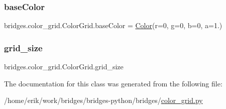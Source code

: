 \subsubsection{\texorpdfstring{base\+Color}{baseColor}}
{\footnotesize\ttfamily bridges.\+color\+\_\+grid.\+Color\+Grid.\+base\+Color = \hyperlink{classbridges_1_1color_1_1_color}{Color}(r=0, g=0, b=0, a=1.)\hspace{0.3cm}{\ttfamily [static]}}

\mbox{\label{classbridges_1_1color__grid_1_1_color_grid_af248634de8b3d7b92feef01eed40821b}} 
\subsubsection{\texorpdfstring{grid\+\_\+size}{grid\_size}}
{\footnotesize\ttfamily bridges.\+color\+\_\+grid.\+Color\+Grid.\+grid\+\_\+size}



The documentation for this class was generated from the following file\+:\begin{DoxyCompactItemize}
\item 
/home/erik/work/bridges/bridges-\/python/bridges/\hyperlink{color__grid_8py}{color\+\_\+grid.\+py}\end{DoxyCompactItemize}
